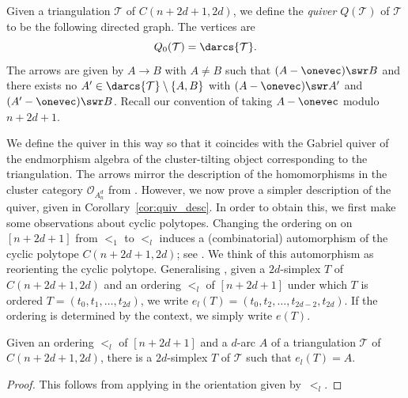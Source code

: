\begin{defi}\label{def:quiver}
Given a triangulation $\mathcal{T}$ of $C(n + 2d + 1, 2d)$, we define the \emph{quiver} $Q(\mathcal{T})$ of $\mathcal{T}$ to be the following directed graph. The vertices are \[Q_{0}(\mathcal{T}) = \darcs{\mathcal{T}}.\] The arrows are given by $A \to B$ with $A \neq B$ such that $(A - \onevec) \swr B$ and there exists no $A' \in \darcs{\mathcal{T}}\setminus\{A, B\}$ with $(A - \onevec) \swr A'$ and $(A' - \onevec) \swr B$. Recall our convention of taking $A - \onevec$ modulo $n + 2d + 1$.
\end{defi}

We define the quiver in this way so that it coincides with the Gabriel quiver of the endmorphism algebra of the cluster-tilting object corresponding to the triangulation. The arrows mirror the description of the homomorphisms in the cluster category $\mathcal{O}_{A_{n}^{d}}$ from \cite{ot}. However, we now prove a simpler description of the quiver, given in Corollary~\ref{cor:quiv_desc}. In order to obtain this, we first make some observations about cyclic polytopes. Changing the ordering on on $[n + 2d + 1]$ from $<_{1}$ to $<_{l}$ induces a (combinatorial) automorphism of the cyclic polytope $C(n + 2d + 1, 2d)$; see \cite{kw}. We think of this automorphism as reorienting the cyclic polytope. Generalising \cite{ot}, given a $2d$-simplex $T$ of $C(n + 2d + 1,2d)$ and an ordering $<_{l}$ of $[n + 2d + 1]$ under which $T$ is ordered $T = (t_{0}, t_{1}, \dots , t_{2d})$, we write $e_{l}(T) = (t_{0}, t_{2}, \dots , t_{2d-2}, t_{2d})$. If the ordering is determined by the context, we simply write $e(T)$.

\begin{lemma}\label{lem:find_2d_simplex}
Given an ordering $<_{l}$ of $[n + 2d + 1]$ and a $d$-arc $A$ of a triangulation $\mathcal{T}$ of $C(n + 2d + 1,2d)$, there is a $2d$-simplex $T$ of $\mathcal{T}$ such that $e_{l}(T) = A$.
\end{lemma}
\begin{proof}
This follows from applying \cite[Proposition 2.13]{ot} in the orientation given by~$<_{l}$.
\end{proof}

